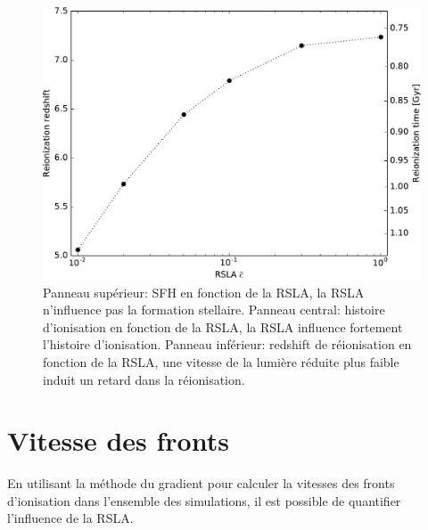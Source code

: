 \begin{figure}
        \includegraphics[height=.3\textheight]{img/04_mapreio/z_rsla.pdf} 
        \caption[Redshift de réionisation en fonction de la RSLA]{
		Panneau supérieur: SFH en fonction de la RSLA, la RSLA n'influence pas la formation stellaire.
		Panneau central: histoire d'ionisation en fonction de la RSLA, la RSLA influence fortement l'histoire d'ionisation.
		Panneau inférieur: redshift de réionisation en fonction de la RSLA, une vitesse de la lumière réduite plus faible induit un retard dans la réionisation.
 		\label{fig:zrsla}}
\end{figure}




\clearpage 
\section{Vitesse des fronts}
\label{sec:compfrontspeep}

En utilisant la méthode du gradient pour calculer la vitesses des fronts d'ionisation dans l'ensemble des simulations, il est possible de quantifier l'influence de la \ac{RSLA}.

